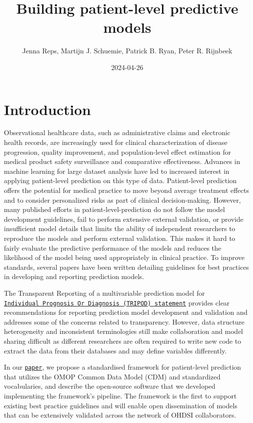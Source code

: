 \documentclass[
]{article}
\title{Building patient-level predictive models}
\author{Jenna Reps, Martijn J. Schuemie, Patrick B. Ryan, Peter R.
Rijnbeek}
\date{2024-04-26}
\begin{document}
\maketitle

{
\setcounter{tocdepth}{3}
\tableofcontents
}
\hypertarget{introduction}{%
\section{Introduction}\label{introduction}}

Observational healthcare data, such as administrative claims and
electronic health records, are increasingly used for clinical
characterization of disease progression, quality improvement, and
population-level effect estimation for medical product safety
surveillance and comparative effectiveness. Advances in machine learning
for large dataset analysis have led to increased interest in applying
patient-level prediction on this type of data. Patient-level prediction
offers the potential for medical practice to move beyond average
treatment effects and to consider personalized risks as part of clinical
decision-making. However, many published efforts in
patient-level-prediction do not follow the model development guidelines,
fail to perform extensive external validation, or provide insufficient
model details that limits the ability of independent researchers to
reproduce the models and perform external validation. This makes it hard
to fairly evaluate the predictive performance of the models and reduces
the likelihood of the model being used appropriately in clinical
practice. To improve standards, several papers have been written
detailing guidelines for best practices in developing and reporting
prediction models.

The Transparent Reporting of a multivariable prediction model for
\href{https://www.equator-network.org/reporting-guidelines/tripod-statement/}{\texttt{Individual\ Prognosis\ Or\ Diagnosis\ (TRIPOD)\ statement}}
provides clear recommendations for reporting prediction model
development and validation and addresses some of the concerns related to
transparency. However, data structure heterogeneity and inconsistent
terminologies still make collaboration and model sharing difficult as
different researchers are often required to write new code to extract
the data from their databases and may define variables differently.

In our
\href{https://academic.oup.com/jamia/article/25/8/969/4989437}{\texttt{paper}},
we propose a standardised framework for patient-level prediction that
utilizes the OMOP Common Data Model (CDM) and standardized vocabularies,
and describe the open-source software that we developed implementing the
framework's pipeline. The framework is the first to support existing
best practice guidelines and will enable open dissemination of models
that can be extensively validated across the network of OHDSI
collaborators.
\end{document}

